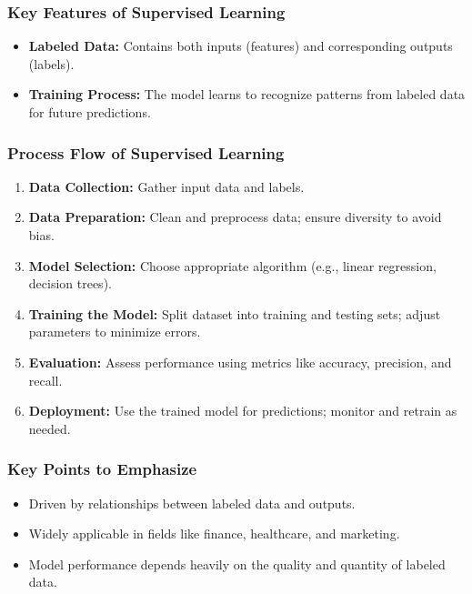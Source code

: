 \documentclass[aspectratio=169]{beamer}
\begin{document}
\begin{frame}[fragile]
    \frametitle{Key Features of Supervised Learning}
    \begin{itemize}
        \item \textbf{Labeled Data:} Contains both inputs (features) and corresponding outputs (labels).
        \item \textbf{Training Process:} The model learns to recognize patterns from labeled data for future predictions.
    \end{itemize}
\end{frame}

\begin{frame}[fragile]
    \frametitle{Process Flow of Supervised Learning}
    \begin{enumerate}
        \item \textbf{Data Collection:} Gather input data and labels.
        \item \textbf{Data Preparation:} Clean and preprocess data; ensure diversity to avoid bias.
        \item \textbf{Model Selection:} Choose appropriate algorithm (e.g., linear regression, decision trees).
        \item \textbf{Training the Model:} Split dataset into training and testing sets; adjust parameters to minimize errors.
        \item \textbf{Evaluation:} Assess performance using metrics like accuracy, precision, and recall.
        \item \textbf{Deployment:} Use the trained model for predictions; monitor and retrain as needed.
    \end{enumerate}
\end{frame}

\begin{frame}[fragile]
    \frametitle{Key Points to Emphasize}
    \begin{itemize}
        \item Driven by relationships between labeled data and outputs.
        \item Widely applicable in fields like finance, healthcare, and marketing.
        \item Model performance depends heavily on the quality and quantity of labeled data.
    \end{itemize}
\end{frame}
\end{document}
